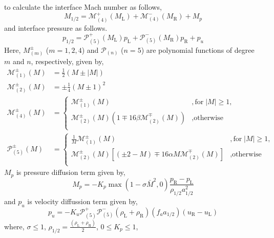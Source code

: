 to calculate the interface Mach number as follows,
\begin{equation}
  M_{\text{1/2}} = \mathcal{M}_{(4)}^+ (M_{\text{L}}) + \mathcal{M}_{(4)}^- (M_{\text{R}}) + M_p
\end{equation}
and interface pressure as follows.
\begin{equation}
p_{\text{1/2}} = \mathcal{P}_{(5)}^{+} \left( M_{\text{L}} \right) p_{\text{L}}
+
\mathcal{P}_{(5)}^{-} \left( M_{\text{R}} \right) p_{\text{R}}
+
p_u
\end{equation}
Here, $M_{(m)}^{\pm}$ ($m = 1, 2, 4$) and $\mathcal{P}_{(n)}$ ($n =
5$) are polynomial functions of degree $m$ and $n$, respectively,
given by,
\begin{align}
\mathcal{M}_{(1)}^{\pm}(M) &= \frac{1}{2} \left( M \pm |M| \right) \\
\mathcal{M}_{(2)}^{\pm}(M) &= \pm \frac{1}{4} \left( M \pm 1 \right)^2 \\
\mathcal{M}_{(4)}^{\pm}(M) &= \begin{cases}
\mathcal{M}_{(1)}^{\pm}(M) & , \text{for} \; |M| \ge 1, \\
\mathcal{M}_{(2)}^{\pm}(M) \left( 1 \mp 16 \beta \mathcal{M}_{(2)}^{\mp}(M) \right) & , \text{otherwise} \\
\end{cases} \\
\mathcal{P}_{(5)}^{\pm}(M) &= \begin{cases}
\frac{1}{M} \mathcal{M}_{(1)}^{\pm}(M) & , \text{for} \; |M| \ge 1, \\
\mathcal{M}_{(2)}^{\pm}(M) \left[ \left( \pm 2 - M \right) \mp 16 \alpha M \mathcal{M}_{(2)}^{\mp}(M) \right] & , \text{otherwise} \\
\end{cases}
\end{align}
$M_p$ is pressure diffusion term given by,
\begin{equation}
M_p = - K_p \max(1 - \sigma \bar{M}^2, 0) \frac{p_{\text{R}} - p_{\text{L}}}{\rho_{\text{1/2}} a_{\text{1/2}}^2}
\end{equation}
and $p_u$ is velocity diffussion term given by,
\begin{equation}
p_u = -K_u \mathcal{P}_{(5)}^{+} \mathcal{P}_{(5)}^{-} \left(
\rho_{\text{L}} + \rho_{\text{R}} \right) \left( f_a a_{\text{1/2}} \right)
\left( u_{\text{R}} - u_{\text{L}} \right)
\end{equation}
where, $\sigma \le 1$, $\rho_{\text{1/2}} = \frac{\left(
  \rho_{\text{L}} + \rho_{\text{R}} \right)}{2}$, $0 \le K_p \le 1$,
